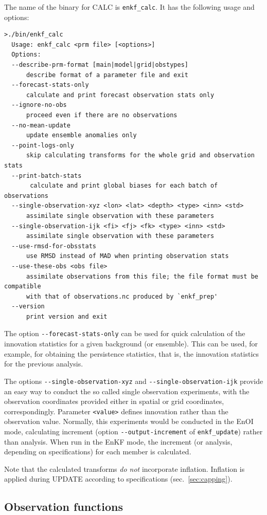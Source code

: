 \documentclass[11pt]{report}
\begin{document}
The name of the binary for CALC is \verb|enkf_calc|.
It has the following usage and options:
\begin{Verbatim}[frame=single,fontsize=\footnotesize]
>./bin/enkf_calc 
  Usage: enkf_calc <prm file> [<options>]
  Options:
  --describe-prm-format [main|model|grid|obstypes]
      describe format of a parameter file and exit
  --forecast-stats-only
      calculate and print forecast observation stats only
  --ignore-no-obs
      proceed even if there are no observations
  --no-mean-update
      update ensemble anomalies only
  --point-logs-only
      skip calculating transforms for the whole grid and observation stats
  --print-batch-stats
       calculate and print global biases for each batch of observations
  --single-observation-xyz <lon> <lat> <depth> <type> <inn> <std>
      assimilate single observation with these parameters
  --single-observation-ijk <fi> <fj> <fk> <type> <inn> <std>
      assimilate single observation with these parameters
  --use-rmsd-for-obsstats
      use RMSD instead of MAD when printing observation stats
  --use-these-obs <obs file>
      assimilate observations from this file; the file format must be compatible
      with that of observations.nc produced by `enkf_prep'
  --version
      print version and exit
\end{Verbatim}

The option \verb|--forecast-stats-only| can be used for quick calculation of the innovation statistics for a given background (or ensemble).
This can be used, for example, for obtaining the persistence statistics, that is, the innovation statistics for the previous analysis.

The options \verb|--single-observation-xyz| and \verb|--single-observation-ijk| provide an easy way to conduct the so called single observation experiments, with the observation coordinates provided either in spatial or grid coordinates, correspondingly.
Parameter \verb|<value>| defines innovation rather than the observation value.
Normally, this experiments would be conducted in the EnOI mode, calculating increment (option \verb|--output-increment| of \verb|enkf_update|) rather than analysis.
When run in the EnKF mode, the increment (or analysis, depending on specifications) for each member is calculated.

Note that the calculated transforms \emph{do not} incorporate inflation.
Inflation is applied during UPDATE according to specifications (sec.~\ref{sec:capping}).

\subsection{Observation functions}
\label{sec:hfunctions}
\end{document}
